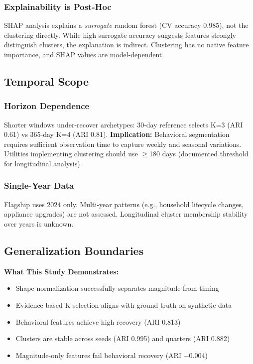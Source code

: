 \subsubsection{Explainability is Post-Hoc}

SHAP analysis explains a \emph{surrogate} random forest (CV accuracy 0.985), not the clustering directly. While high surrogate accuracy suggests features strongly distinguish clusters, the explanation is indirect. Clustering has no native feature importance, and SHAP values are model-dependent.

\subsection{Temporal Scope}

\subsubsection{Horizon Dependence}

Shorter windows under-recover archetypes: 30-day reference selects K=3 (ARI 0.61) vs 365-day K=4 (ARI 0.81). \textbf{Implication:} Behavioral segmentation requires sufficient observation time to capture weekly and seasonal variations. Utilities implementing clustering should use $\geq$180 days (documented threshold for longitudinal analysis).

\subsubsection{Single-Year Data}

Flagship uses 2024 only. Multi-year patterns (e.g., household lifecycle changes, appliance upgrades) are not assessed. Longitudinal cluster membership stability over years is unknown.

\subsection{Generalization Boundaries}

\textbf{What This Study Demonstrates:}
\begin{itemize}
    \item Shape normalization successfully separates magnitude from timing
    \item Evidence-based K selection aligns with ground truth on synthetic data
    \item Behavioral features achieve high recovery (ARI 0.813)
    \item Clusters are stable across seeds (ARI 0.995) and quarters (ARI 0.882)
    \item Magnitude-only features fail behavioral recovery (ARI $-0.004$)
\end{itemize}

